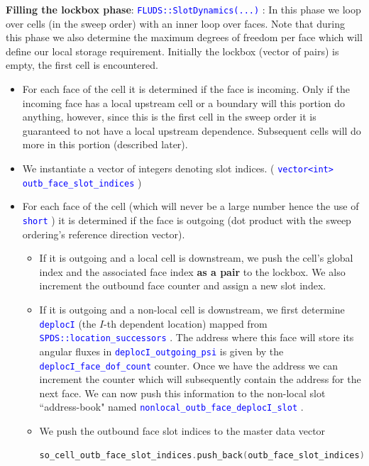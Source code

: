 \documentclass[11pt,letterpaper,titlepage]{article}
\newcommand{\xmltag}[1]{\textcolor{blue}{ \texttt{#1}} }
\numberwithin{equation}{section}
\begin{document}
\newpage
\textbf{Filling the lockbox phase}:\newline
\xmltag{FLUDS::SlotDynamics(...)}:\newline
In this phase we loop over cells (in the sweep order) with an inner loop over faces. Note that during this phase we also determine the maximum degrees of freedom per face which will define our local storage requirement.
\newline
\newline
Initially the lockbox (vector of pairs) is empty, the first cell is encountered. 
\begin{itemize}
\item For each face of the cell it is determined if the face is incoming. Only if the incoming face has a local upstream cell or a boundary will this portion do anything, however, since this is the first cell in the sweep order it is guaranteed to not have a local upstream dependence. Subsequent cells will do more in this portion (described later).
\item We instantiate a vector of integers denoting slot indices.\newline
 (\xmltag{vector<int> outb\_face\_slot\_indices})
\item For each face of the cell (which will never be a large number hence the use of \xmltag{short}) it is determined if the face is outgoing (dot product with the sweep ordering's reference direction vector). 
\begin{itemize}
\item If it is outgoing and a local cell is downstream, we push the cell's global index and the associated face index \textbf{as a pair} to the lockbox. We also increment the outbound face counter and assign a new slot index.
\item If it is outgoing and a non-local cell is downstream, we first determine \xmltag{deplocI} (the $I$-th dependent location) mapped from \xmltag{SPDS::location\_successors}. The address where this face will store its angular fluxes in \xmltag{deplocI\_outgoing\_psi} is given by the  \xmltag{deplocI\_face\_dof\_count} counter. Once we have the address we can increment the counter which will subsequently contain the address for the next face. We can now push this information to the non-local slot ``address-book" named \xmltag{nonlocal\_outb\_face\_deplocI\_slot}.
\item We push the outbound face slot indices to the master data vector
\begin{lstlisting}[language=c++]
so_cell_outb_face_slot_indices.push_back(outb_face_slot_indices);
\end{lstlisting}
\end{itemize}


\end{itemize}
\end{document}
